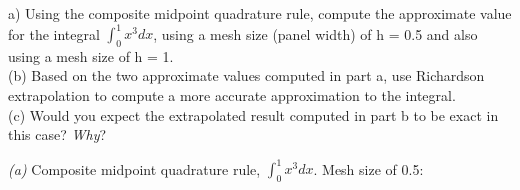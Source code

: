 \documentclass[12pt]{article}
\newenvironment{problem}[2][Problem]{\begin{trivlist}
\item[\hskip \labelsep {\bfseries #1}\hskip \labelsep {\bfseries #2.}]}{\end{trivlist}}
\begin{document}
\begin{problem}{8.2}
 (a) Using the composite midpoint quadrature rule, compute the approximate value for the integral $\int_0^1x^3dx$, using a mesh size (panel width) of h = 0.5 and also using a mesh size of h = 1.\\
(b) Based on the two approximate values computed in part a, use Richardson extrapolation to compute a more accurate approximation to the integral.\\
(c) Would you expect the extrapolated result computed in part b to be exact in this case? \textit{Why}?

\textit{(a)}
Composite midpoint quadrature rule, $\int_0^1x^3dx$.
Mesh size of 0.5:



\end{problem}

\begin{problem}{8.2,    8.5,    8.6,    8.9,    8.10}
\end{problem}
\end{document}
